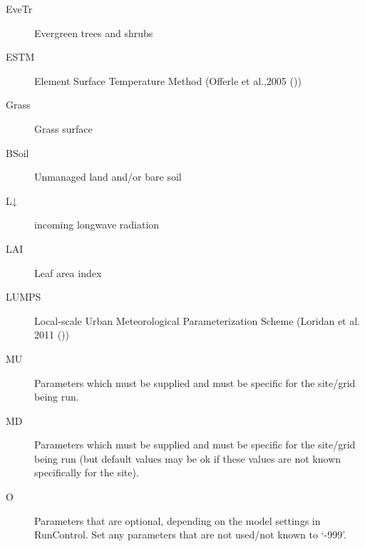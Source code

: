 \documentclass[letterpaper,10pt,english]{sphinxmanual}
\begin{document}
\begin{description}
\item[{EveTr}] \leavevmode{}\label{\detokenize{notation:term-evetr}}
Evergreen trees and shrubs

\item[{ESTM}] \leavevmode{}\label{\detokenize{notation:term-estm}}
Element Surface Temperature Method (Offerle et al.,2005 \label{\detokenize{notation:id1}}{\hyperref[\detokenize{references:oaf2005}]{\sphinxcrossref{{[}Oaf2005{]}}}} ())

\item[{Grass}] \leavevmode{}\label{\detokenize{notation:term-grass}}
Grass surface

\item[{BSoil}] \leavevmode{}\label{\detokenize{notation:term-bsoil}}
Unmanaged land and/or bare soil

\item[{L↓}] \leavevmode{}\label{\detokenize{notation:term-l}}
incoming longwave radiation

\item[{LAI}] \leavevmode{}\label{\detokenize{notation:term-lai}}
Leaf area index

\item[{LUMPS}] \leavevmode{}\label{\detokenize{notation:term-lumps}}
Local-scale Urban Meteorological Parameterization Scheme
(Loridan   et al. 2011 \label{\detokenize{notation:id2}}{\hyperref[\detokenize{references:l2011}]{\sphinxcrossref{{[}L2011{]}}}} ())

\item[{MU}] \leavevmode{}\label{\detokenize{notation:term-mu}}
Parameters which must be supplied and must be specific for the site/grid being run.

\item[{MD}] \leavevmode{}\label{\detokenize{notation:term-md}}
Parameters which must be supplied and must be specific for the site/grid being run (but default values may be ok if these values are not known specifically for the site).

\item[{O}] \leavevmode{}\label{\detokenize{notation:term-o}}
Parameters that are optional, depending on the model settings in RunControl. Set any parameters that are not used/not known to ‘-999’.


\end{description}
\end{document}

